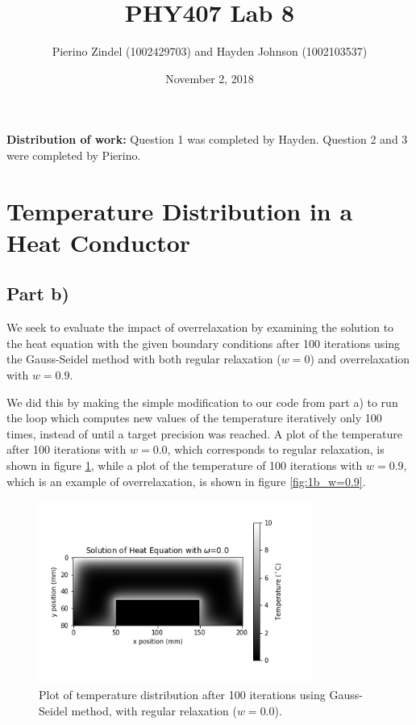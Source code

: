 \documentclass{article}
\title{PHY407 Lab 8}
\author{Pierino Zindel (1002429703) and Hayden Johnson (1002103537)}
\date{November 2, 2018}
\begin{document}
\maketitle

\noindent \textbf{Distribution of work:} Question 1 was completed by Hayden. Question 2 and 3 were completed by Pierino.

\section{Temperature Distribution in a Heat Conductor}

\subsection{Part b)}

We seek to evaluate the impact of overrelaxation by examining the solution to the heat equation with the given boundary conditions after 100 iterations using the Gauss-Seidel method with both regular relaxation ($w=0$) and overrelaxation with $w=0.9$. 

We did this by making the simple modification to our code from part a) to run the loop which computes new values of the temperature iteratively only 100 times, instead of until a target precision was reached. A plot of the temperature after 100 iterations with $w=0.0$, which corresponds to regular relaxation, is shown in figure \ref{fig:1b_w=0.0}, while a plot of the temperature of 100 iterations with $w=0.9$, which is an example of overrelaxation, is shown in figure \ref{fig:1b_w=0.9}. 

\begin{figure}[H]
	\centering
	\includegraphics[width=0.8\textwidth]{../images/q1_b_0p0.png}
	\caption{Plot of temperature distribution after 100 iterations using Gauss-Seidel method, with regular relaxation ($w=0.0$).}
	\label{fig:1b_w=0.0}
\end{figure}
\end{document}
